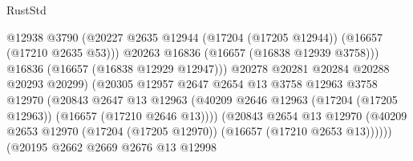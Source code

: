 \begin{lexlean}{RustStd}
\begin{coremodule}
                                            @12938
                                            @3790
                                            (@20227
                                              @2635
                                              @12944
                                              (@17204 (@17205 @12944))
                                              (@16657 (@17210 @2635 @53)))
                                            @20263
                                            @16836
                                            (@16657 (@16838 @12939 @3758)))
                                          @16836
                                          (@16657 (@16838 @12929 @12947)))
                                        @20278
                                        @20281
                                        @20284
                                        @20288
                                        @20293
                                        @20299)
                                      (@20305
                                        @12957
                                        @2647
                                        @2654
                                        @13
                                        @3758
                                        @12963
                                        @3758
                                        @12970
                                        (@20843
                                          @2647
                                          @13
                                          @12963
                                          (@40209
                                            @2646
                                            @12963
                                            (@17204 (@17205 @12963))
                                            (@16657 (@17210 @2646 @13))))
                                        (@20843
                                          @2654
                                          @13
                                          @12970
                                          (@40209
                                            @2653
                                            @12970
                                            (@17204 (@17205 @12970))
                                            (@16657 (@17210 @2653 @13))))))
                                    (@20195
                                      @2662
                                      @2669
                                      @2676
                                      @13
                                      @12998

\end{coremodule}
\end{lexlean}
